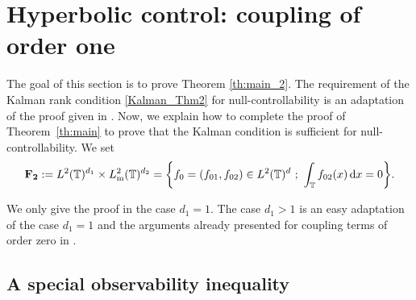 \documentclass[JEP,XML,SOM,Unicode,NoEqCountersInSection]{cedram}
\theoremstyle{plain}
\theoremstyle{definition}
\theoremstyle{remark}
\newcommand{\diff}[1][-3]{\ensuremath{\mathop{}\mkern#1mu\mathrm{d}}}
\newcommand{\set}{\mathbb}
\newcommand{\T}{\set{T}}
\newcommand{\coloneqq}{\mathrel{\mathord{:}\mathord=}}
\newcommand{\m}{{\mathrm m}}
\let\originalleft\left
\let\originalright\right
\renewcommand{\left}{\mathopen{}\mathclose\bgroup\originalleft}
\renewcommand{\right}{\aftergroup\egroup\originalright}
\begin{document}
\section{Hyperbolic control: coupling of order one} \label{Sec:Hyp}

The goal of this section is to prove Theorem \ref{th:main_2}.
The requirement of the Kalman rank condition \eqref{Kalman_Thm2} for null-controllability is an adaptation of the proof given in . Now, we explain how to complete the proof of Theorem~\ref{th:main} to prove that the Kalman condition is sufficient for null-controllability. We set
\begin{equation}
\label{defInvQuant}
\mathbf{F_2} \coloneqq L^2(\T)^{d_1} \times L^2_\m(\T)^{d_2} = \left\{ f_0=(f_{01},f_{02}) \in L^2(\T)^d\ ;\ \int_{\T} f_{02}(x) \diff x = 0\right\}.
\end{equation}

We only give the proof in the case $d_1=1$. The case $d_1 >1$ is an easy adaptation of the case $d_1=1$ and the arguments already presented for coupling terms of order zero in .

\subsection{A special observability inequality}
\end{document}
